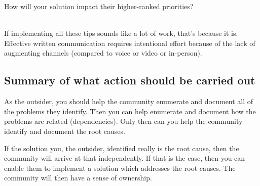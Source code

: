 How will your solution impact their higher-ranked priorities?

\ \\

If implementing all these tips sounds like a lot of work, that's because it is. Effective written communication requires intentional effort because of the lack of augmenting channels (compared to voice or video or in-person). 




\subsection*{Summary of what action should be carried out} 

As the outsider, you should help the community enumerate and document all of the problems they identify. Then you can help enumerate and document how the problems are related (dependencies). Only then can you help the community identify and document the root causes.

If the solution you, the outsider, identified really is the root cause, then the community will arrive at that independently. If that is the case, then you can enable them to implement a solution which addresses the root causes. The community will then have a sense of ownership.
